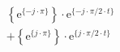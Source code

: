 \[
\begin{split}
& \left \{ \textrm{e}^{\{-j \cdot \pi \}} \right \} \cdot \textrm{e}^{\{- j \cdot \pi/2 \cdot t \}}\\
&+\left \{ \textrm{e}^{\{ j \cdot \pi \}} \right \} \cdot \textrm{e}^{\{  j \cdot \pi/2 \cdot t \}}
\end{split}
\]
